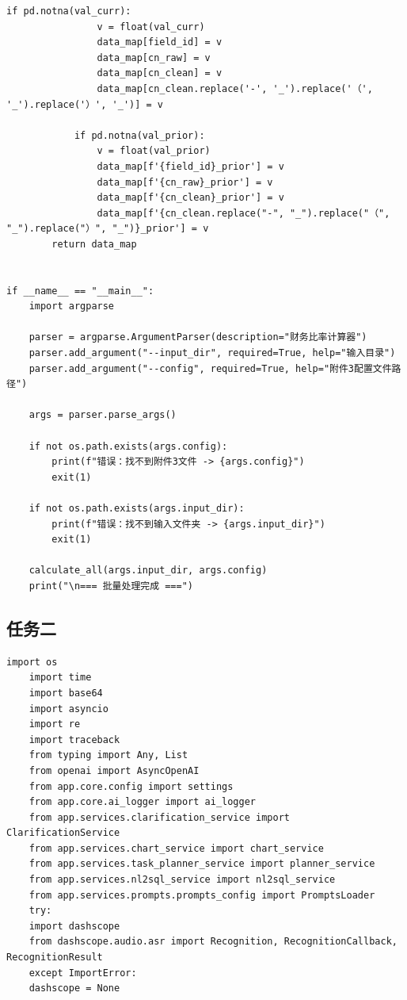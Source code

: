 \documentclass[withoutpreface,bwprint]{cumcmthesis} %
\begin{document}
\begin{appendices}
\begin{lstlisting}[caption={数据公式计算模块部分代码}, label={lst:code1}]
            if pd.notna(val_curr):
                v = float(val_curr)
                data_map[field_id] = v
                data_map[cn_raw] = v
                data_map[cn_clean] = v
                data_map[cn_clean.replace('-', '_').replace('（', '_').replace('）', '_')] = v

            if pd.notna(val_prior):
                v = float(val_prior)
                data_map[f'{field_id}_prior'] = v
                data_map[f'{cn_raw}_prior'] = v
                data_map[f'{cn_clean}_prior'] = v
                data_map[f'{cn_clean.replace("-", "_").replace("（", "_").replace("）", "_")}_prior'] = v
		return data_map


if __name__ == "__main__":
    import argparse
    
    parser = argparse.ArgumentParser(description="财务比率计算器")
    parser.add_argument("--input_dir", required=True, help="输入目录")
    parser.add_argument("--config", required=True, help="附件3配置文件路径")
    
    args = parser.parse_args()
    
    if not os.path.exists(args.config):
        print(f"错误：找不到附件3文件 -> {args.config}")
        exit(1)
    
    if not os.path.exists(args.input_dir):
        print(f"错误：找不到输入文件夹 -> {args.input_dir}")
        exit(1)
    
    calculate_all(args.input_dir, args.config)
    print("\n=== 批量处理完成 ===")
	\end{lstlisting}

	\subsection{任务二}
	\label{code:sensitivity}
	\begin{lstlisting}[caption={智能体部分主代码}, label={lst:code1}]
	import os
	import time
	import base64
	import asyncio
	import re
	import traceback
	from typing import Any, List
	from openai import AsyncOpenAI
	from app.core.config import settings
	from app.core.ai_logger import ai_logger
	from app.services.clarification_service import ClarificationService
	from app.services.chart_service import chart_service
	from app.services.task_planner_service import planner_service
	from app.services.nl2sql_service import nl2sql_service
	from app.services.prompts.prompts_config import PromptsLoader
	try:
	import dashscope
	from dashscope.audio.asr import Recognition, RecognitionCallback, RecognitionResult
	except ImportError:
	dashscope = None


\end{lstlisting}
\end{appendices}
\end{document}
